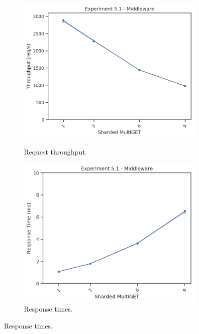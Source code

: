         \begin{figure}
            \vspace*{-.5\baselineskip}
                \centering
            \begin{subfigure}[t!]{0.48\textwidth}
                \centering
                \includegraphics[width=\textwidth]{../data_analysis/figures/5-1_mw_thoughput.png}
                \caption{Request throughput.\label{fig:shard_mw_tp}}
                \includegraphics[width=\textwidth]{../data_analysis/figures/5-1_mw_response-time.png}
                \caption{Response times.\label{fig:shard_mw_rt}}
            \end{subfigure}

\end{figure}
